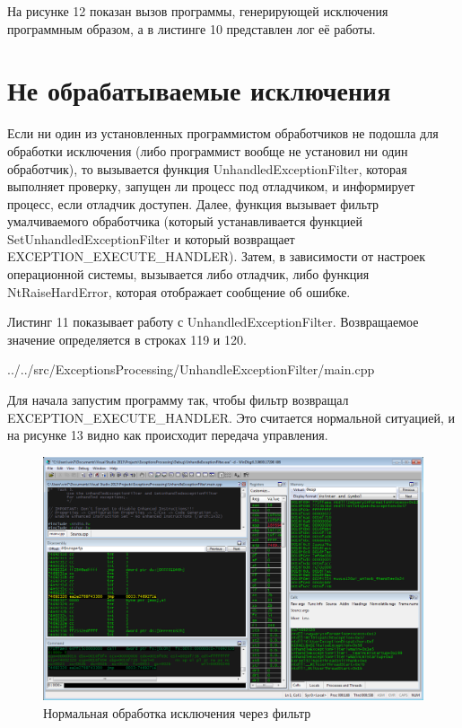 \documentclass[a4paper, 12pt]{report}		%
\begin{document}
На рисунке 12 показан вызов программы, генерирующей исключения программным образом, а в листинге 10 представлен лог её работы.




\chapter*{Не обрабатываемые исключения}

Если ни один из установленных программистом обработчиков не подошла для обработки исключения (либо программист вообще не установил ни один обработчик), то вызывается функция UnhandledExceptionFilter, которая выполняет проверку, запущен ли процесс под отладчиком, и информирует процесс, если отладчик доступен. Далее, функция вызывает фильтр умалчиваемого обработчика (который устанавливается функцией SetUnhandledExceptionFilter и который возвращает EXCEPTION\_EXECUTE\_HANDLER). Затем, в зависимости от настроек операционной системы, вызывается либо отладчик, либо функция NtRaiseHardError, которая отображает сообщение об ошибке. 

Листинг 11 показывает работу с UnhandledExceptionFilter. Возвращаемое значение определяется в строках 119 и 120.


{../../src/ExceptionsProcessing/UnhandleExceptionFilter/main.cpp}

Для начала запустим программу так, чтобы фильтр возвращал EXCEPTION\_EXECUTE\_HANDLER. Это считается нормальной ситуацией, и на рисунке 13 видно как происходит передача управления.

\begin{figure}[h!]
\centering
\includegraphics[scale=0.5]{res/006}
\caption{Нормальная обработка исключения через фильтр}
\end{figure}
\end{document}
